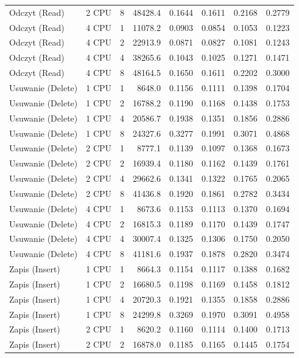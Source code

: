 \begin{table}[ht]
{\begin{tabular}{llcrrrrr}
Odczyt (Read) & 2 CPU & 8 & 48428.4 & 0.1644 & 0.1611 & 0.2168 & 0.2779 \\
Odczyt (Read) & 4 CPU & 1 & 11078.2 & 0.0903 & 0.0854 & 0.1053 & 0.1223 \\
Odczyt (Read) & 4 CPU & 2 & 22913.9 & 0.0871 & 0.0827 & 0.1081 & 0.1243 \\
Odczyt (Read) & 4 CPU & 4 & 38265.6 & 0.1043 & 0.1025 & 0.1271 & 0.1471 \\
Odczyt (Read) & 4 CPU & 8 & 48164.5 & 0.1650 & 0.1611 & 0.2202 & 0.3000 \\
Usuwanie (Delete) & 1 CPU & 1 & 8648.0 & 0.1156 & 0.1111 & 0.1398 & 0.1704 \\
Usuwanie (Delete) & 1 CPU & 2 & 16788.2 & 0.1190 & 0.1168 & 0.1438 & 0.1753 \\
Usuwanie (Delete) & 1 CPU & 4 & 20586.7 & 0.1938 & 0.1351 & 0.1856 & 0.2886 \\
Usuwanie (Delete) & 1 CPU & 8 & 24327.6 & 0.3277 & 0.1991 & 0.3071 & 0.4868 \\
Usuwanie (Delete) & 2 CPU & 1 & 8777.1 & 0.1139 & 0.1097 & 0.1368 & 0.1673 \\
Usuwanie (Delete) & 2 CPU & 2 & 16939.4 & 0.1180 & 0.1162 & 0.1439 & 0.1761 \\
Usuwanie (Delete) & 2 CPU & 4 & 29662.6 & 0.1341 & 0.1322 & 0.1765 & 0.2065 \\
Usuwanie (Delete) & 2 CPU & 8 & 41436.8 & 0.1920 & 0.1861 & 0.2782 & 0.3434 \\
Usuwanie (Delete) & 4 CPU & 1 & 8673.6 & 0.1153 & 0.1113 & 0.1370 & 0.1694 \\
Usuwanie (Delete) & 4 CPU & 2 & 16815.3 & 0.1189 & 0.1170 & 0.1439 & 0.1747 \\
Usuwanie (Delete) & 4 CPU & 4 & 30007.4 & 0.1325 & 0.1306 & 0.1750 & 0.2050 \\
Usuwanie (Delete) & 4 CPU & 8 & 41181.6 & 0.1937 & 0.1878 & 0.2820 & 0.3474 \\
Zapis (Insert) & 1 CPU & 1 & 8664.3 & 0.1154 & 0.1117 & 0.1388 & 0.1682 \\
Zapis (Insert) & 1 CPU & 2 & 16680.5 & 0.1198 & 0.1169 & 0.1458 & 0.1812 \\
Zapis (Insert) & 1 CPU & 4 & 20720.3 & 0.1921 & 0.1355 & 0.1858 & 0.2886 \\
Zapis (Insert) & 1 CPU & 8 & 24299.8 & 0.3269 & 0.1970 & 0.3091 & 0.4958 \\
Zapis (Insert) & 2 CPU & 1 & 8620.2 & 0.1160 & 0.1114 & 0.1400 & 0.1713 \\
Zapis (Insert) & 2 CPU & 2 & 16878.0 & 0.1185 & 0.1165 & 0.1445 & 0.1754 \\

\end{tabular}}
\end{table}
